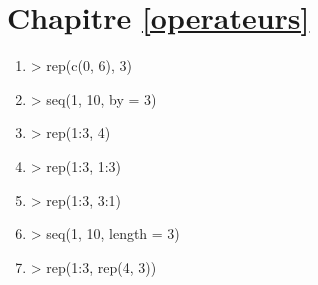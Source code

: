 \section*{Chapitre \ref{operateurs}}
\begin{reponse}{3.1}
    \begin{enumerate}
\item
\begin{Schunk}
\begin{Sinput}
> rep(c(0, 6), 3)
\end{Sinput}
\end{Schunk}
\item
\begin{Schunk}
\begin{Sinput}
> seq(1, 10, by = 3)
\end{Sinput}
\end{Schunk}
\item
\begin{Schunk}
\begin{Sinput}
> rep(1:3, 4)
\end{Sinput}
\end{Schunk}
\item
\begin{Schunk}
\begin{Sinput}
> rep(1:3, 1:3)
\end{Sinput}
\end{Schunk}
\item
\begin{Schunk}
\begin{Sinput}
> rep(1:3, 3:1)
\end{Sinput}
\end{Schunk}
\item
\begin{Schunk}
\begin{Sinput}
> seq(1, 10, length = 3)
\end{Sinput}
\end{Schunk}
\item
\begin{Schunk}
\begin{Sinput}
> rep(1:3, rep(4, 3))
\end{Sinput}
\end{Schunk}
    \end{enumerate}
  
\end{reponse}
